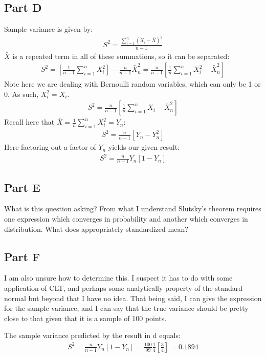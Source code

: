 \documentclass{article}
\begin{document}
\subsection*{Part D}
Sample variance is given by:
\begin{align*}
S^2 = \frac{\sum_{i=1}^{n} (X_i-\bar{X})^2}{n-1}
\end{align*}
$\bar{X}$ is a repeated term in all of these summations, so it can be separated:
\begin{align*}
S^2 = [\frac{1}{n-1} \sum_{i=1}^{n} X_i^2] - \frac{n}{n-1} \bar{X}^2_n = \frac{n}{n-1} [\frac{1}{n} \sum_{i=1}^{n} X_i^2-\bar{X}_n^2]
\end{align*}
Note here we are dealing with Bernoulli random variables, which can only be 1 or 0. As such, $X_i^2=X_i$.
\begin{align*}
S^2 = \frac{n}{n-1} [\frac{1}{n} \sum_{i=1}^{n} X_i-\bar{X}_n^2]
\end{align*}
Recall here that $\bar{X}=\frac{1}{n} \sum_{i=1}^{n} X_i^2 = Y_n$:
\begin{align*}
S^2 = \frac{n}{n-1} [Y_n-Y_n^2]
\end{align*}
Here factoring out a factor of $Y_n$ yields our given result:
\begin{align*}
\boxed{ S^2 = \frac{n}{n-1} Y_n[1-Y_n] }
\end{align*}

\subsection*{Part E}
%
What is this question asking? From what I understand Slutsky's theorem requires one expression which converges in probability and another which converges in distribution. What does appropriately standardized mean?

\subsection*{Part F}
%
I am also unsure how to determine this. I suspect it has to do with some application of CLT, and perhaps some analytically property of the standard normal but beyond that I have no idea. That being said, I can give the expression for the sample variance, and I can say that the true variance should be pretty close to that given that it is a sample of 100 points.


The sample variance predicted by the result in d equals:
\begin{align*}
\boxed{ S^2 = \frac{n}{n-1} Y_n[1-Y_n] = \frac{100}{99} \tfrac{1}{4}[\frac{3}{4}] = 0.1894 }
\end{align*}
\clearpage
\end{document}
